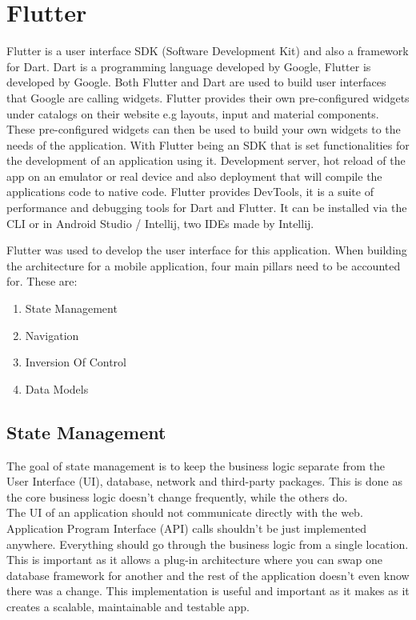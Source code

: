 \section{Flutter}
Flutter is a user interface SDK (Software Development Kit) and also a framework for Dart. Dart is a programming language developed by Google, Flutter is developed by Google.
Both Flutter and Dart are used to build user interfaces that Google are calling widgets. Flutter provides their own pre-configured widgets under catalogs on their website e.g layouts, input and material components. These pre-configured widgets can then be used to build your own widgets to the needs of the application.
With Flutter being an SDK that is set functionalities for the development of an application using it. Development server, hot reload of the app on an emulator or real device and also deployment that will compile the applications code to native code.
Flutter provides DevTools, it is a suite of performance and debugging tools for Dart and Flutter. It can be installed via the CLI or in Android Studio / Intellij, two IDEs made by Intellij.


Flutter was used to develop the user interface for this application. When building the architecture for a mobile application, four main pillars need to be accounted for. These are:
\begin{enumerate}
	\item State Management
	\item Navigation
	\item Inversion Of Control
	\item Data Models
\end{enumerate}

\subsection{State Management}
The goal of state management is to keep the business logic separate from the User Interface (UI), database, network and third-party packages. This is done as the core business logic doesn't change frequently, while the others do.
\\ The UI of an application should not communicate directly with the web. Application Program Interface (API) calls shouldn't be just implemented anywhere. Everything should go through the business logic from a single location.
\\ This is important as it allows a plug-in architecture where you can swap one database framework for another and the rest of the application doesn't even know there was a change. This implementation is useful and important as it makes as it creates a scalable, maintainable and testable app.

